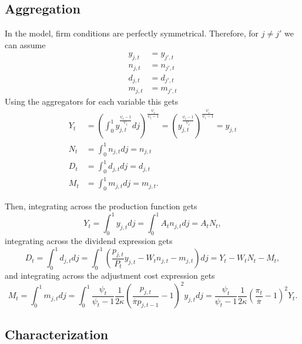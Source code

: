 \subsection{Aggregation}

In the model, firm conditions are perfectly symmetrical. Therefore, for $j \neq j'$ we can assume
\begin{align*}
    y_{j, t} &= y_{j', t} \\
    n_{j, t} &= n_{j', t} \\
    d_{j, t} &= d_{j', t} \\
    m_{j, t} &= m_{j', t}
\end{align*}
Using the aggregators for each variable this gets
\begin{align*}
    Y_t &= \left( \int_0^1 y_{j, t}^\frac{\psi_t - 1}{\psi_t} dj \right)^\frac{\psi_t}{\psi_t - 1} = \left( y_{j, t}^\frac{\psi_t - 1}{\psi_t} \right)^\frac{\psi_t}{\psi_t - 1} = y_{j, t} \\
    N_t &= \int_0^1 n_{j, t} dj = n_{j, t} \\
    D_t &= \int_0^1 d_{j, t} dj = d_{j, t} \\
    M_t &= \int_0^1 m_{j, t} dj = m_{j, t}.
\end{align*}

Then, integrating across the production function gets
\begin{equation*}
    Y_t = \int_0^1 y_{j, t} dj = \int_0^1 A_t n_{j, t} dj = A_t N_t,
\end{equation*}
integrating across the dividend expression gets
\begin{equation*}
    D_t = \int_0^1 d_{j, t} dj = \int_0^1 \left( \frac{p_{j, t}}{P_t} y_{j, t} - W_t n_{j, t} - m_{j, t} \right) dj = Y_t - W_t N_t - M_t,
\end{equation*}
and integrating across the adjustment cost expression gets
\begin{equation*}
    M_t = \int_0^1 m_{j, t} dj = \int_0^1 \frac{\psi_t}{\psi_t - 1}  \frac{1}{2 \kappa} \left(\frac{p_{j, t}}{\overline{\pi} p_{j, t - 1}} - 1\right)^2 y_{j, t} dj = \frac{\psi_t}{\psi_t - 1} \frac{1}{2 \kappa} \left( \frac{\pi_t}{\overline{\pi}} - 1 \right)^2 Y_t.
\end{equation*}


\subsection{Characterization}

